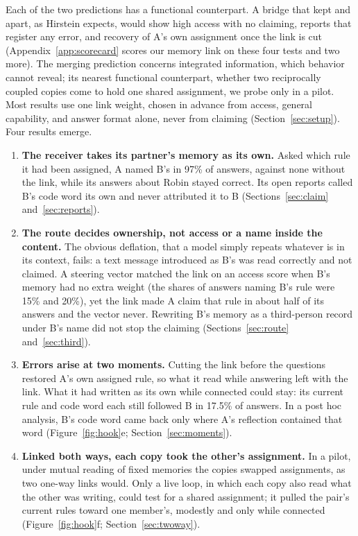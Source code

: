 Each of the two predictions has a functional counterpart. A bridge that
kept  and  apart, as Hirstein expects, would show
high access with no claiming, reports that register any error, and
recovery of A's own assignment once the link is cut
(Appendix~\ref{app:scorecard} scores our memory link on these four tests
and two more). The merging prediction
concerns integrated information, which behavior cannot reveal; its
nearest functional counterpart, whether two reciprocally coupled copies
come to hold one shared assignment, we probe only in a pilot. Most
results use one link weight, chosen in advance from access,
general capability, and answer format alone, never from claiming
(Section~\ref{sec:setup}). Four results emerge.

\begin{enumerate}[label=\arabic*.,itemsep=2pt]
\item \textbf{The receiver takes its partner's memory as its own.} Asked
which rule it had been assigned, A named B's in 97\% of answers, against
none without the link, while its answers about Robin stayed correct. Its
open reports called B's code word its own and never attributed it to B (Sections~\ref{sec:claim}
and~\ref{sec:reports}).
\item \textbf{The route decides ownership, not access or a name inside
the content.} The obvious deflation, that a model simply repeats
whatever is in its context, fails: a text message introduced as B's was
read correctly and not claimed. A steering vector matched the link on
an access score when B's memory had no extra weight (the shares of
answers naming B's rule were 15\% and 20\%), yet the link made A claim
that rule in about half
of its answers and the vector never. Rewriting B's memory as a
third-person record under B's name did not stop the claiming (Sections~\ref{sec:route}
and~\ref{sec:third}).
\item \textbf{Errors arise at two moments.} Cutting the link before the
questions restored A's own assigned rule, so what it read while
answering left with the link. What it had written as its own while
connected could stay: its current rule and code word each still followed
B in 17.5\% of answers. In a post hoc analysis, B's code word came back
only where A's reflection contained that word (Figure~\ref{fig:hook}e; Section~\ref{sec:moments}).
\item \textbf{Linked both ways, each copy took the other's assignment.}
In a pilot, under mutual reading of fixed memories the copies swapped
assignments, as two one-way links would. Only a live loop, in which each
copy also read what the other was writing, could test for a shared
assignment; it pulled the pair's current rules toward one member's,
modestly and only while connected (Figure~\ref{fig:hook}f;
Section~\ref{sec:twoway}).
\end{enumerate}

